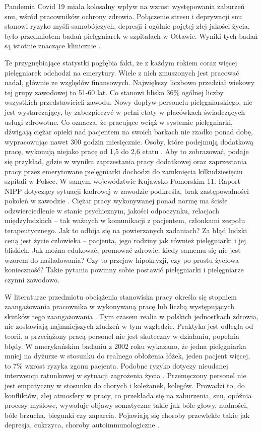 \documentclass[a4paper,12pt,twoside,openright]{mwrep}
\begin{document}
Pandemia Covid 19 miała kolosalny wpływ na wzrost występowania zaburzeń snu, wśród pracowników ochrony zdrowia. Połączenie stresu i deprywacji snu stanowi ryzyko myśli samobójczych, depresji i ogólnie pojętej złej jakości życia, było przedmiotem badań pielęgniarek w szpitalach w Ottawie. Wyniki tych badań są istotnie znaczące klinicznie \cite{sen}.

Te przygnębiające statystki pogłębia fakt, że z każdym rokiem coraz więcej pielęgniarek odchodzi na emerytury. Wiele z nich zmuszonych jest pracować nadal, głównie ze względów finansowych.  Największy liczbowo przedział wiekowy tej grupy zawodowej to 51-60 lat. Co stanowi blisko 36\% ogólnej liczby wszystkich przedstawicieli zawodu. Nowy dopływ personelu pielęgniarskiego, nie jest wystarczający, by zabezpieczyć w pełni etaty w placówkach świadczących usługi zdrowotne. Co oznacza, że pracujące wciąż w systemie pielęgniarki, dźwigają ciężar opieki nad pacjentem na swoich barkach nie rzadko ponad dobę, wypracowując nawet 300 godzin miesięcznie. Osoby, które podejmują dodatkową pracę, wykonują niejako pracę od 1,5 do 2,6 etatu \cite{cyfrowe}. Aby to zobrazować, podaje się przykład, gdzie w wyniku zaprzestania pracy dodatkowej oraz zaprzestania pracy przez emerytowane pielęgniarki dochodzi do zamknięcia kilkudziesięciu szpitali w Polsce. W samym województwie Kujawsko-Pomorskim 11. Raport NIPP dotyczący sytuacji kadrowej w zawodzie podkreśla, brak zastępowalności pokoleń w zawodzie \cite{statystyka}. Ciężar pracy wykonywanej ponad normę ma ścisłe odzwierciedlenie w  stanie psychicznym, jakości  odpoczynku, relacjach międzyludzkich – tak ważnych w komunikacji z pacjentem, członkami zespołu terapeutycznego. Jak to odbija się na powierzanych zadaniach? Za błąd ludzki ceną jest życie człowieka – pacjenta, jego rodziny jak również pielęgniarki i jej bliskich. Jak można edukować, promować zdrowie, kiedy samemu się nie jest wzorem do naśladowania? Czy to przejaw hipokryzji, czy po prostu życiowa konieczność? Takie pytania powinny sobie postawić pielęgniarki i pielęgniarze czynni zawodowo.

W literaturze przedmiotu obciążenia stanowiska pracy określa się stopniem zaangażowania pracownika w wykonywaną pracę lub liczbą występujących skutków tego zaangażowania \cite{stanowisko}. Tym czasem realia w polskich jednostkach zdrowia, nie zostawiają najmniejszych złudzeń w tym względzie. Praktyka jest odległa od teorii, a przeciążony pracą personel nie jest skuteczny w działaniu, popełnia błędy. W amerykańskim badaniu z 2002 roku wykazano, że jedna pielęgniarka mniej na dyżurze w stosunku do realnego obłożenia łóżek, jeden pacjent więcej, to 7\% wzrost ryzyka zgonu pacjenta. Podobne ryzyko dotyczy nieudanej interwencji ratunkowej w sytuacji zagrożenia życia \cite{rko}. Przemęczony personel nie jest empatyczny w stosunku do chorych i koleżanek, kolegów. Prowadzi to, do konfliktów, złej atmosfery w pracy, co przekłada się na zaburzenia, snu, opóźnia procesy myślowe, wywołuje objawy somatyczne takie jak bóle głowy, nudności, bóle brzucha, biegunki czy zaparcia. Pojawiają się choroby przewlekłe takie jak depresja, cukrzyca, choroby autoimmunologiczne \cite{zdrowie}.
\end{document}
